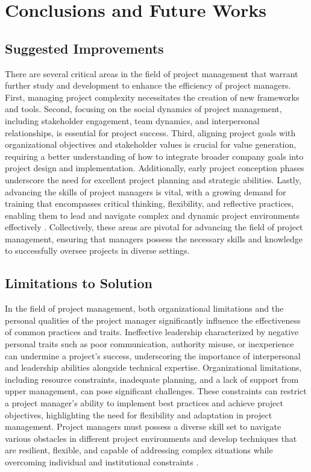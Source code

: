 \documentclass{article}
\begin{document}
\section{Conclusions and Future Works}
\subsection{Suggested Improvements}

There are several critical areas in the field of project management that warrant further study and development to enhance the efficiency of project managers. First, managing project complexity necessitates the creation of new frameworks and tools. Second, focusing on the social dynamics of project management, including stakeholder engagement, team dynamics, and interpersonal relationships, is essential for project success. Third, aligning project goals with organizational objectives and stakeholder values is crucial for value generation, requiring a better understanding of how to integrate broader company goals into project design and implementation. Additionally, early project conception phases underscore the need for excellent project planning and strategic abilities. Lastly, advancing the skills of project managers is vital, with a growing demand for training that encompasses critical thinking, flexibility, and reflective practices, enabling them to lead and navigate complex and dynamic project environments effectively \cite{winter2006directions}. Collectively, these areas are pivotal for advancing the field of project management, ensuring that managers possess the necessary skills and knowledge to successfully oversee projects in diverse settings.


\subsection{Limitations to Solution}


In the field of project management, both organizational limitations and the personal qualities of the project manager significantly influence the effectiveness of common practices and traits. Ineffective leadership characterized by negative personal traits such as poor communication, authority misuse, or inexperience can undermine a project's success, underscoring the importance of interpersonal and leadership abilities alongside technical expertise. Organizational limitations, including resource constraints, inadequate planning, and a lack of support from upper management, can pose significant challenges. These constraints can restrict a project manager's ability to implement best practices and achieve project objectives, highlighting the need for flexibility and adaptation in project management. Project managers must possess a diverse skill set to navigate various obstacles in different project environments and develop techniques that are resilient, flexible, and capable of addressing complex situations while overcoming individual and institutional constraints \cite{toor2009ineffective}.
\end{document}
